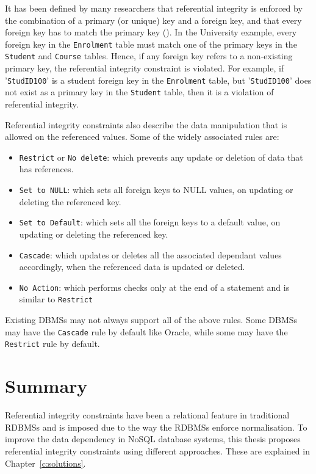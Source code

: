 It has been defined by many researchers that referential integrity is enforced
by the combination of a primary (or unique) key and a foreign key, and that
every foreign key has to match the primary key (). In the
University example, every foreign key in the \texttt{Enrolment} table must match
one of the primary keys in the \texttt{Student} and \texttt{Course} tables.
Hence, if any foreign key refers to a non-existing primary key, the
referential integrity constraint is violated.  For example, if
'\texttt{StudID100}' is a student foreign key in the \texttt{Enrolment} table,
but '\texttt{StudID100}' does not exist as a primary key in the \texttt{Student}
table, then it is a violation of referential integrity.
 
Referential integrity constraints also describe the data manipulation that is
allowed on the referenced values. Some of the widely associated rules are:

\begin{itemize}
  \item \texttt{Restrict} or \texttt{No delete}: which prevents any update or
  deletion of data that has references.
\item \texttt{Set to NULL}: which sets all foreign keys to NULL values, on
updating or deleting the referenced key.
\item \texttt{Set to Default}: which sets all the foreign
keys to a default value, on updating or deleting the referenced key.
\item \texttt{Cascade}: which updates or deletes all the
associated dependant values accordingly, when the referenced data is updated or
deleted.
\item \texttt{No Action}: which performs checks only at the end of a
statement and is similar to \texttt{Restrict}
\end{itemize}

Existing \acp{DBMS} may not always support all of the above rules. Some \acp{DBMS} may
have the \texttt{Cascade} rule by default like Oracle, while some may have the
\texttt{Restrict} rule by default. 



\section{Summary}

Referential integrity constraints have been a relational feature in traditional
\acp{RDBMS} and is imposed due to the way the \acp{RDBMS} enforce normalisation.
To improve the data dependency in \ac{NoSQL} database systems, this thesis
proposes referential integrity constraints using different approaches. These are
explained in Chapter~\ref{c:solutions}.

